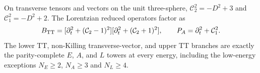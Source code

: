 \begin{theorem}
On transverse tensors and vectors on the unit three-sphere,
$\mathcal C_2^2=-D^2+3$ and $\mathcal C_1^2=-D^2+2$.
The Lorentzian reduced operators factor as
\[B_{\rm TT}=[\partial_t^2+(\mathcal C_2-1)^2]
[\partial_t^2+(\mathcal C_2+1)^2],\qquad
P_A=\partial_t^2+\mathcal C_1^2.\]
The lower TT, non-Killing transverse-vector, and upper TT branches
are exactly the parity-complete $E$, $A$, and $L$ towers at every
energy, including the low-energy exceptions $N_E\ge2$, $N_A\ge3$
and $N_L\ge4$.
\end{theorem}
